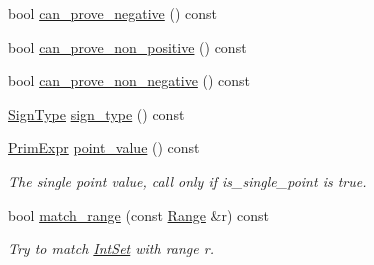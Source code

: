 \begin{DoxyCompactItemize}
\item 
bool \hyperlink{classtvm_1_1arith_1_1IntSet_a407b23e6a7ab7af70aba0ba77eaec218}{can\+\_\+prove\+\_\+negative} () const 
\item 
bool \hyperlink{classtvm_1_1arith_1_1IntSet_a4d56a12f7d192e5b739f83999ab4ccc3}{can\+\_\+prove\+\_\+non\+\_\+positive} () const 
\item 
bool \hyperlink{classtvm_1_1arith_1_1IntSet_a70785e828279d810ec4d34137cd588cf}{can\+\_\+prove\+\_\+non\+\_\+negative} () const 
\item 
\hyperlink{namespacetvm_1_1arith_aca8806e355ad3dd5f1df9c1eca9aac9d}{Sign\+Type} \hyperlink{classtvm_1_1arith_1_1IntSet_a36d9ef554088056be1ce517f1ceea3f1}{sign\+\_\+type} () const 
\item 
\hyperlink{classtvm_1_1PrimExpr}{Prim\+Expr} \hyperlink{classtvm_1_1arith_1_1IntSet_a0c8ce073360823084109d976721174b5}{point\+\_\+value} () const 
\begin{DoxyCompactList}\small\item\em The single point value, call only if is\+\_\+single\+\_\+point is true. \end{DoxyCompactList}\item 
bool \hyperlink{classtvm_1_1arith_1_1IntSet_af6b303660c7d2bf53f48716c9c8f9abe}{match\+\_\+range} (const \hyperlink{classtvm_1_1Range}{Range} \&r) const 
\begin{DoxyCompactList}\small\item\em Try to match \hyperlink{classtvm_1_1arith_1_1IntSet}{Int\+Set} with range r. \end{DoxyCompactList}\end{DoxyCompactItemize}
